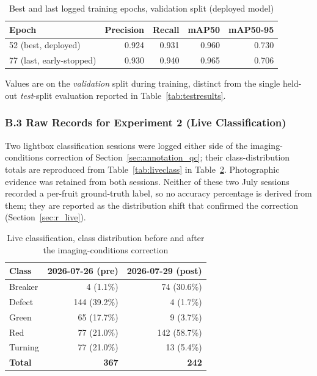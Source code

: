 \begin{table}[H]
\caption{Best and last logged training epochs, validation split (deployed model)}
\label{tab:appendixB_epochs}
\centering
\begin{tabular}{lrrrr}
\toprule
\textbf{Epoch} & \textbf{Precision} & \textbf{Recall} & \textbf{mAP50} & \textbf{mAP50-95} \\
\midrule
52 (best, deployed) & 0.924 & 0.931 & 0.960 & 0.730 \\
77 (last, early-stopped) & 0.930 & 0.940 & 0.965 & 0.706 \\
\bottomrule
\end{tabular}

\vspace{2mm}
{\footnotesize Values are on the \emph{validation} split during training, distinct from the single held-out \emph{test}-split evaluation reported in Table~\ref{tab:testresults}.}
\end{table}

\subsubsection*{B.3 Raw Records for Experiment 2 (Live Classification)}

Two lightbox classification sessions were logged either side of the imaging-conditions correction of Section~\ref{sec:annotation_qc}; their class-distribution totals are reproduced from Table~\ref{tab:liveclass} in Table~\ref{tab:appendixB_live}. Photographic evidence was retained from both sessions. Neither of these two July sessions recorded a per-fruit ground-truth label, so no accuracy percentage is derived from them; they are reported as the distribution shift that confirmed the correction (Section~\ref{sec:r_live}).

\begin{table}[H]
\caption{Live classification, class distribution before and after the imaging-conditions correction}
\label{tab:appendixB_live}
\centering
\begin{tabular}{lrr}
\toprule
\textbf{Class} & \textbf{2026-07-26 (pre)} & \textbf{2026-07-29 (post)} \\
\midrule
Breaker & 4 (1.1\%)   & 74 (30.6\%) \\
Defect  & 144 (39.2\%) & 4 (1.7\%) \\
Green   & 65 (17.7\%)  & 9 (3.7\%) \\
Red     & 77 (21.0\%)  & 142 (58.7\%) \\
Turning & 77 (21.0\%)  & 13 (5.4\%) \\
\midrule
\textbf{Total} & \textbf{367} & \textbf{242} \\
\bottomrule
\end{tabular}
\end{table}


